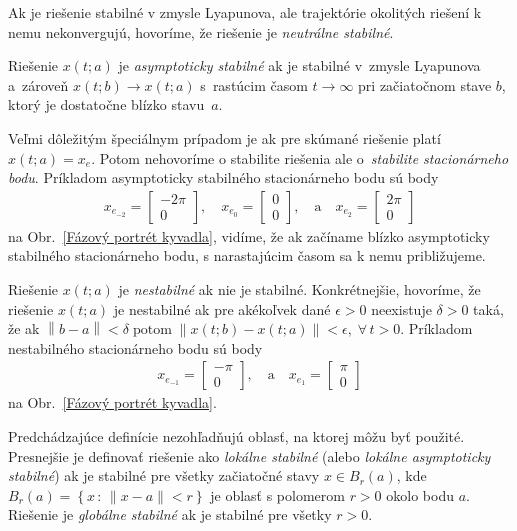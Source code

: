 \documentclass[a4paper, 10pt, ]{article}
\begin{document}
Ak je riešenie stabilné v zmysle Lyapunova, ale trajektórie okolitých riešení k nemu nekonvergujú, hovoríme, že riešenie je \emph{neutrálne stabilné}.

Riešenie $x(t;a)$ je \emph{asymptoticky stabilné} ak je stabilné v~zmysle Lyapunova a~zároveň $x(t;b) \to x(t;a)$ s~rastúcim časom $t \to \infty$ pri začiatočnom stave $b$, ktorý je dostatočne blízko stavu~$a$.

Veľmi dôležitým špeciálnym prípadom je ak pre skúmané riešenie platí $x(t;a) = x_e$. Potom nehovoríme o stabilite riešenia ale o~\emph{stabilite stacionárneho bodu}. Príkladom asymptoticky stabilného stacionárneho bodu sú body
\begin{align*}
	x_{e_{-2}} =
	\begin{bmatrix}
		-2\pi \\ 0
	\end{bmatrix},
	\quad
	x_{e_{0}} =
	\begin{bmatrix}
		0 \\ 0
	\end{bmatrix},
	\quad
	\text{a}
	\quad
	x_{e_{2}} =
	\begin{bmatrix}
		2 \pi \\ 0
	\end{bmatrix}
\end{align*}
na Obr.~\ref{Fázový portrét kyvadla}, vidíme, že ak začíname blízko asymptoticky stabilného stacionárneho bodu, s narastajúcim časom sa k nemu približujeme.

Riešenie $x(t;a)$ je \emph{nestabilné} ak nie je stabilné. Konkrétnejšie, hovoríme, že riešenie $x(t;a)$ je nestabilné ak pre akékoľvek dané $\epsilon > 0$ neexistuje $\delta > 0$ taká, že ak $\left\| b - a \right\| < \delta \; \text{potom} \; \left\| x(t;b) - x(t;a) \right\| < \epsilon, \; \forall \, t>0$. Príkladom nestabilného stacionárneho bodu sú body
\begin{align*}
	x_{e_{-1}} =
	\begin{bmatrix}
		-\pi \\ 0
	\end{bmatrix},
	\quad
	\text{a}
	\quad
	x_{e_{1}} =
	\begin{bmatrix}
		\pi \\ 0
	\end{bmatrix}
\end{align*}
na Obr.~\ref{Fázový portrét kyvadla}.

Predchádzajúce definície nezohľadňujú oblasť, na ktorej môžu byť použité. Presnejšie je definovať riešenie ako \emph{lokálne stabilné} (alebo \emph{lokálne asymptoticky stabilné}) ak je stabilné pre všetky začiatočné stavy $x \in B_r(a)$, kde $B_r(a) = \left\{ x \, : \, \| x - a \| < r \right\}$ je oblasť s polomerom $r > 0$ okolo bodu $a$. Riešenie je \emph{globálne stabilné} ak je stabilné pre všetky $r > 0$.
\end{document}
